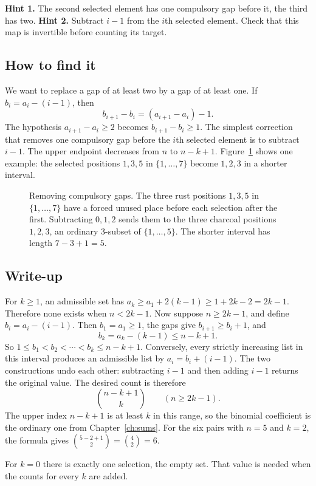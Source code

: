 \textbf{Hint 1.} The second selected element has one compulsory gap before it, the third has two. \textbf{Hint 2.} Subtract $i-1$ from the $i$th selected element. Check that this map is invertible before counting its target.

\subsection*{How to find it}
We want to replace a gap of at least two by a gap of at least one. If $b_i=a_i-(i-1)$, then
\[
b_{i+1}-b_i=(a_{i+1}-a_i)-1.
\]
The hypothesis $a_{i+1}-a_i\ge 2$ becomes $b_{i+1}-b_i\ge 1$. The simplest correction that removes one compulsory gap before the $i$th selected element is to subtract $i-1$. The upper endpoint decreases from $n$ to $n-k+1$. Figure~\ref{fig:gaps} shows one example: the selected positions $1,3,5$ in $\{1,\dots,7\}$ become $1,2,3$ in a shorter interval.

\begin{figure}[ht]
\centering
{}
\caption{Removing compulsory gaps. The three rust positions $1,3,5$ in $\{1,\dots,7\}$ have a forced unused place before each selection after the first. Subtracting $0,1,2$ sends them to the three charcoal positions $1,2,3$, an ordinary $3$-subset of $\{1,\dots,5\}$. The shorter interval has length $7-3+1=5$.}
\label{fig:gaps}
\end{figure}

\subsection*{Write-up}
For $k\ge 1$, an admissible set has $a_k\ge a_1+2(k-1)\ge 1+2k-2=2k-1$. Therefore none exists when $n<2k-1$. Now suppose $n\ge 2k-1$, and define $b_i=a_i-(i-1)$. Then $b_1=a_1\ge 1$, the gaps give $b_{i+1}\ge b_i+1$, and
\[
b_k=a_k-(k-1)\le n-k+1.
\]
So $1\le b_1<b_2<\cdots<b_k\le n-k+1$. Conversely, every strictly increasing list in this interval produces an admissible list by $a_i=b_i+(i-1)$. The two constructions undo each other: subtracting $i-1$ and then adding $i-1$ returns the original value. The desired count is therefore
\[
\binom{n-k+1}{k}\qquad(n\ge 2k-1).
\]
The upper index $n-k+1$ is at least $k$ in this range, so the binomial coefficient is the ordinary one from Chapter~\ref{ch:sums}. For the six pairs with $n=5$ and $k=2$, the formula gives $\binom{5-2+1}{2}=\binom42=6$.

For $k=0$ there is exactly one selection, the empty set. That value is needed when the counts for every $k$ are added.

